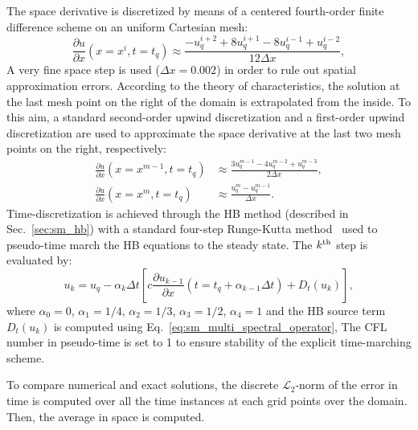 The space derivative is discretized by means of a centered 
fourth-order finite difference scheme on an uniform Cartesian mesh:
\begin{equation}
    \frac{\partial u}{\partial x} (x = x^i, t=t_q) \approx 
    \frac{-u^{i+2}_{q} + 8 u^{i+1}_{q} - 8 u^{i-1}_{q} + u^{i-2}_{q}}{12\Delta x},
    \label{eq:convection_center4}
\end{equation}
A very fine space step is used ($\Delta x=0.002$) in order to rule 
out spatial approximation errors. According to the theory 
of characteristics, the solution at the last mesh 
point on the right of the domain is extrapolated 
from the inside. To this aim, a standard second-order 
upwind discretization and a first-order upwind discretization 
are used to approximate the space derivative at 
the last two mesh points on the right, respectively:
\begin{align}
    \frac{\partial u}{\partial x} (x = x^{m-1}, t=t_q) &\approx 
    \frac{3 u^{m-1}_{q} - 4 u^{m-2}_{q} + u^{m-3}_{q}}{2\Delta x}, \\
    \frac{\partial u}{\partial x} (x = x^m, t=t_q) &\approx 
    \frac{u^{m}_{q} - u^{m-1}_{q}}{\Delta x}.
\label{eq:upwind_scheme}
\end{align}
Time-discretization is achieved 
through the HB method (described in Sec.~\ref{sec:sm_hb})
with a standard four-step Runge-Kutta method~\cite{Jameson1981}
used to pseudo-time 
march the HB equations to the steady state.
The $k\textsuperscript{th}$ step is evaluated by:
\begin{equation}
    u_k = u_q - \alpha_k \Delta t \left [ 
          c \frac{\partial u_{k-1}}{\partial x} (t=t_q + \alpha_{k-1} \Delta t)
          + D_t(u_k)
          \right],
    \label{eq:convection_rk4}
\end{equation}
where $\alpha_0 = 0$, $\alpha_1 = 1/4$, 
$\alpha_2 = 1/3$, $\alpha_3 = 1/2$, $\alpha_4 = 1$ and 
the HB source term $D_t(u_k)$ is computed using Eq.~\eqref{eq:sm_multi_spectral_operator},
The CFL number in pseudo-time is set to 1 
to ensure stability of the explicit time-marching scheme.

To compare numerical and exact solutions, 
the discrete $\mathcal{L}_2$-norm of the error 
in time is computed over all the time instances
at each grid points over the domain.
Then, the average in 
space is computed.


